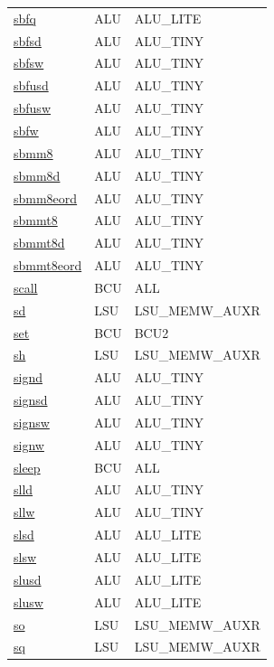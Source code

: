 \begin{small}
\begin{longtable}[l]{l l l}
\hyperlink{lvx.sbfq}{sbfq} & ALU & ALU\_LITE \\ 
\hyperlink{lvx.sbfsd}{sbfsd} & ALU & ALU\_TINY \\ 
\hyperlink{lvx.sbfsw}{sbfsw} & ALU & ALU\_TINY \\ 
\hyperlink{lvx.sbfusd}{sbfusd} & ALU & ALU\_TINY \\ 
\hyperlink{lvx.sbfusw}{sbfusw} & ALU & ALU\_TINY \\ 
\hyperlink{lvx.sbfw}{sbfw} & ALU & ALU\_TINY \\ 
\hyperlink{lvx.sbmm8}{sbmm8} & ALU & ALU\_TINY \\ 
\hyperlink{lvx.sbmm8d}{sbmm8d} & ALU & ALU\_TINY \\ 
\hyperlink{lvx.sbmm8eord}{sbmm8eord} & ALU & ALU\_TINY \\ 
\hyperlink{lvx.sbmmt8}{sbmmt8} & ALU & ALU\_TINY \\ 
\hyperlink{lvx.sbmmt8d}{sbmmt8d} & ALU & ALU\_TINY \\ 
\hyperlink{lvx.sbmmt8eord}{sbmmt8eord} & ALU & ALU\_TINY \\ 
\hyperlink{lvx.scall}{scall} & BCU & ALL \\ 
\hyperlink{lvx.sd}{sd} & LSU & LSU\_MEMW\_AUXR \\ 
\hyperlink{lvx.set}{set} & BCU & BCU2 \\ 
\hyperlink{lvx.sh}{sh} & LSU & LSU\_MEMW\_AUXR \\ 
\hyperlink{lvx.signd}{signd} & ALU & ALU\_TINY \\ 
\hyperlink{lvx.signsd}{signsd} & ALU & ALU\_TINY \\ 
\hyperlink{lvx.signsw}{signsw} & ALU & ALU\_TINY \\ 
\hyperlink{lvx.signw}{signw} & ALU & ALU\_TINY \\ 
\hyperlink{lvx.sleep}{sleep} & BCU & ALL \\ 
\hyperlink{lvx.slld}{slld} & ALU & ALU\_TINY \\ 
\hyperlink{lvx.sllw}{sllw} & ALU & ALU\_TINY \\ 
\hyperlink{lvx.slsd}{slsd} & ALU & ALU\_LITE \\ 
\hyperlink{lvx.slsw}{slsw} & ALU & ALU\_LITE \\ 
\hyperlink{lvx.slusd}{slusd} & ALU & ALU\_LITE \\ 
\hyperlink{lvx.slusw}{slusw} & ALU & ALU\_LITE \\ 
\hyperlink{lvx.so}{so} & LSU & LSU\_MEMW\_AUXR \\ 
\hyperlink{lvx.sq}{sq} & LSU & LSU\_MEMW\_AUXR \\ 

\end{longtable}
\end{small}

